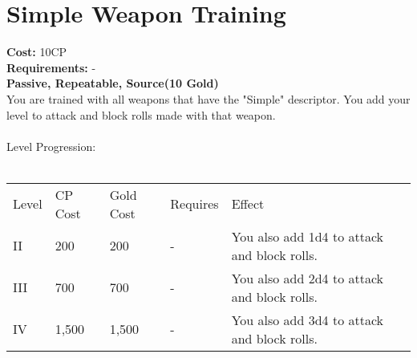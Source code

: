 \section{Simple Weapon Training}\label{perk:simpleWeaponTraining}
\textbf{Cost:} 10CP\\
\textbf{Requirements:} -\\
\textbf{Passive, Repeatable, Source(10 Gold)}\\
You are trained with all weapons that have the "Simple" descriptor.
You add your level to attack and block rolls made with that weapon.\\
\\
Level Progression:\\
\\
\begin{tabular}{l | l | l | l | l}
	Level & CP Cost & Gold Cost & Requires & Effect\\
	II & 200 & 200 & - & You also add 1d4 to attack and block rolls.\\
	III & 700 & 700 & - & You also add 2d4 to attack and block rolls.\\
	IV & 1,500 & 1,500 & - & You also add 3d4 to attack and block rolls.\\
\end{tabular}